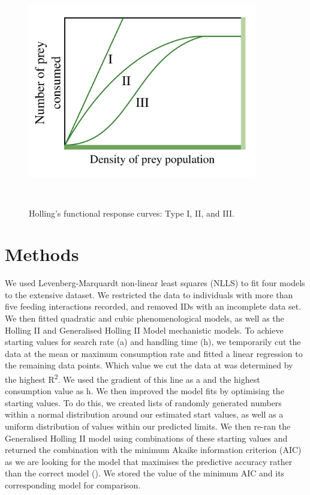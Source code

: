 \documentclass[11pt]{article}
\begin{document}
	\begin{figure}[h!]
		\centering	
		\includegraphics[width=10cm,height=10cm,keepaspectratio]{"../FunctionalResponsesGraph"}
		\caption{Holling's functional response curves: Type I, II, and III. }
	\end{figure}	

	\newpage
	
	\section*{Methods}
	
	We used Levenberg-Marquardt non-linear least squares (NLLS) to fit four models to the extensive dataset. We restricted the data to individuals with more than five feeding interactions recorded, and removed IDs with an incomplete data set. We then fitted quadratic and cubic phenomenological models, as well as the Holling II and Generalised Holling II Model mechanistic models. To achieve starting values for search rate (a) and handling time (h), we temporarily cut the data at the mean or maximum consumption rate and fitted a linear regression to the remaining data points. Which value we cut the data at was determined by the highest R\textsuperscript{2}. We used the gradient of this line as a and the highest consumption value as h. We then improved the model fits by optimising the starting values. To do this, we created lists of randomly generated numbers within a normal distribution around our estimated start values, as well as a uniform distribution of values within our predicted limits. We then re-ran the Generalised Holling II model using combinations of these starting values and returned the combination with the minimum Akaike information criterion (AIC) as we are looking for the model that maximises the predictive accuracy rather than the correct model (\cite{Aho2014}). We stored the value of the minimum AIC and its corresponding model for comparison.
	
\end{document}
